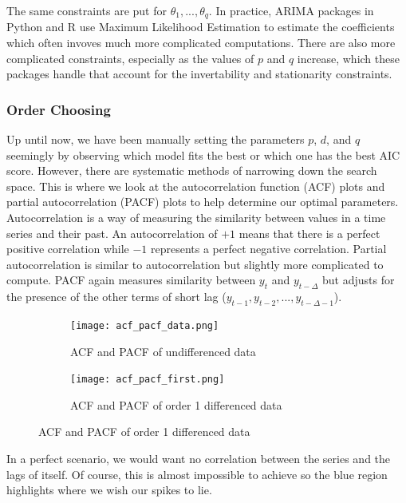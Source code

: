 \documentclass{article}
\begin{document}
  The same constraints are put for $\theta_1,...,\theta_q$. In practice, ARIMA packages in Python and R use Maximum Likelihood Estimation to estimate the coefficients which often invoves much more complicated computations. There are also more complicated constraints, especially as the values of $p$ and $q$ increase, which these packages handle that account for the invertability and stationarity constraints.

  \newpage
  \subsubsection{Order Choosing}
  Up until now, we have been manually setting the parameters $p$, $d$, and $q$ seemingly by observing which model fits the best or which one has the best AIC score. However, there are systematic methods of narrowing down the search space. This is where we look at the autocorrelation function (ACF) plots and partial autocorrelation (PACF) plots to help determine our optimal parameters. Autocorrelation is a way of measuring the similarity between values in a time series and their past. An autocorrelation of $+1$ means that there is a perfect positive correlation while $-1$ represents a perfect negative correlation. Partial autocorrelation is similar to autocorrelation but slightly more complicated to compute. PACF again measures similarity between $y_t$ and $y_{t-\Delta}$ but adjusts for the presence of the other terms of short lag ($y_{t-1}, y_{t-2},...,y_{t-\Delta-1}$).

  \begin{figure}[H]
    \centering
    \captionsetup{justification=centering}
    \begin{subfigure}[b]{\linewidth}
      \texttt{[image: acf\_pacf\_data.png]}
      \caption{ACF and PACF of undifferenced data}
    \end{subfigure}
    \begin{subfigure}[b]{\linewidth}
      \texttt{[image: acf\_pacf\_first.png]}
      \caption{ACF and PACF of order 1 differenced data}
    \end{subfigure}
  \end{figure}
  

  In a perfect scenario, we would want no correlation between the series and the lags of itself. Of course, this is almost impossible to achieve so the blue region highlights where we wish our spikes to lie. 
\end{document}
